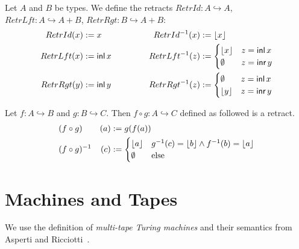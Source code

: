 \begin{definition}
  \label{def:retracts-basic}
  Let $A$ and $B$ be types.  We define the retracts $RetrId : A \hookrightarrow A$, $RetrLft : A \hookrightarrow A+B$, $RetrRgt : B \hookrightarrow A+B$:
  \begin{alignat*}{2}
    RetrId(x)  &:= x      &\qquad\qquad RetrId ^{-1} (x) &:= \left\lfloor {x} \right\rfloor \\
    RetrLft(x) &:= \operatorname{\textsf{inl}} x &             RetrLft^{-1} (z) &:=
    \begin{cases}
      \left\lfloor {x} \right\rfloor & z = \operatorname{\textsf{inl}} x \\
      \emptyset   & z = \operatorname{\textsf{inr}} y
    \end{cases} \\
    RetrRgt(y) &:= \operatorname{\textsf{inl}} y & RetrRgt^{-1} (z) &:=
    \begin{cases}
      \emptyset   & z = \operatorname{\textsf{inl}} x \\
      \left\lfloor {y} \right\rfloor & z = \operatorname{\textsf{inr}} y
    \end{cases}
  \end{alignat*}
\end{definition}

\begin{definition}
  \label{def:retract-compose}
  Let $f : A \hookrightarrow B$ and $g : B \hookrightarrow C$.  Then $f \circ g : A \hookrightarrow C$ defined as followed is a retract.
  \begin{alignat*}{2}
    & (f \circ g)      & (a) &:= g(f(a)) \\
    & (f \circ g)^{-1} & (c) &:=
                          \begin{cases}
                            \left\lfloor {a} \right\rfloor & g^{-1}(c) = \left\lfloor {b} \right\rfloor \land f^{-1}(b) = \left\lfloor {a} \right\rfloor \\
                            \emptyset   & \text{else}
                          \end{cases}
  \end{alignat*}
\end{definition}







\section{Machines and Tapes}
\label{sec:machine-tapes}

We use the definition of \emph{multi-tape Turing machines} and their semantics from Asperti and Ricciotti~\cite{asperti2015}.

